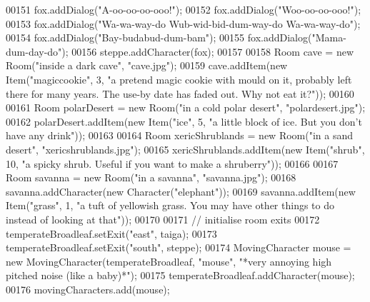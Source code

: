 \begin{DoxyCode}
00151         fox.addDialog(\textcolor{stringliteral}{"A-oo-oo-oo-ooo!"});
00152         fox.addDialog(\textcolor{stringliteral}{"Woo-oo-oo-ooo!"});
00153         fox.addDialog(\textcolor{stringliteral}{"Wa-wa-way-do Wub-wid-bid-dum-way-do Wa-wa-way-do"});
00154         fox.addDialog(\textcolor{stringliteral}{"Bay-budabud-dum-bam"});
00155         fox.addDialog(\textcolor{stringliteral}{"Mama-dum-day-do"});
00156         steppe.addCharacter(fox);
00157 
00158         Room cave = \textcolor{keyword}{new} Room(\textcolor{stringliteral}{"inside a dark cave"}, \textcolor{stringliteral}{"cave.jpg"});
00159         cave.addItem(\textcolor{keyword}{new} Item(\textcolor{stringliteral}{"magiccookie"}, 3, \textcolor{stringliteral}{"a pretend magic cookie with mould on it, probably left
       there for many years. The use-by date has faded out. Why not eat it?"}));
00160 
00161         Room polarDesert = \textcolor{keyword}{new} Room(\textcolor{stringliteral}{"in a cold polar desert"}, \textcolor{stringliteral}{"polardesert.jpg"});
00162         polarDesert.addItem(\textcolor{keyword}{new} Item(\textcolor{stringliteral}{"ice"}, 5, \textcolor{stringliteral}{"a little block of ice. But you don't have any drink"}));
00163 
00164         Room xericShrublands = \textcolor{keyword}{new} Room(\textcolor{stringliteral}{"in a sand desert"}, \textcolor{stringliteral}{"xericshrublands.jpg"});
00165         xericShrublands.addItem(\textcolor{keyword}{new} Item(\textcolor{stringliteral}{"shrub"}, 10, \textcolor{stringliteral}{"a spicky shrub. Useful if you want to make a
       shruberry"}));
00166 
00167         Room savanna = \textcolor{keyword}{new} Room(\textcolor{stringliteral}{"in a savanna"}, \textcolor{stringliteral}{"savanna.jpg"});
00168         savanna.addCharacter(\textcolor{keyword}{new} Character(\textcolor{stringliteral}{"elephant"}));
00169         savanna.addItem(\textcolor{keyword}{new} Item(\textcolor{stringliteral}{"grass"}, 1, \textcolor{stringliteral}{"a tuft of yellowish grass. You may have other things to do
       instead of looking at that"}));
00170 
00171         \textcolor{comment}{// initialise room exits}
00172         temperateBroadleaf.setExit(\textcolor{stringliteral}{"east"}, taiga);
00173         temperateBroadleaf.setExit(\textcolor{stringliteral}{"south"}, steppe);
00174         MovingCharacter mouse = \textcolor{keyword}{new} MovingCharacter(temperateBroadleaf, \textcolor{stringliteral}{"mouse"}, \textcolor{stringliteral}{"*very annoying high
       pitched noise (like a baby)*"});
00175         temperateBroadleaf.addCharacter(mouse);
00176         movingCharacters.add(mouse);

\end{DoxyCode}
